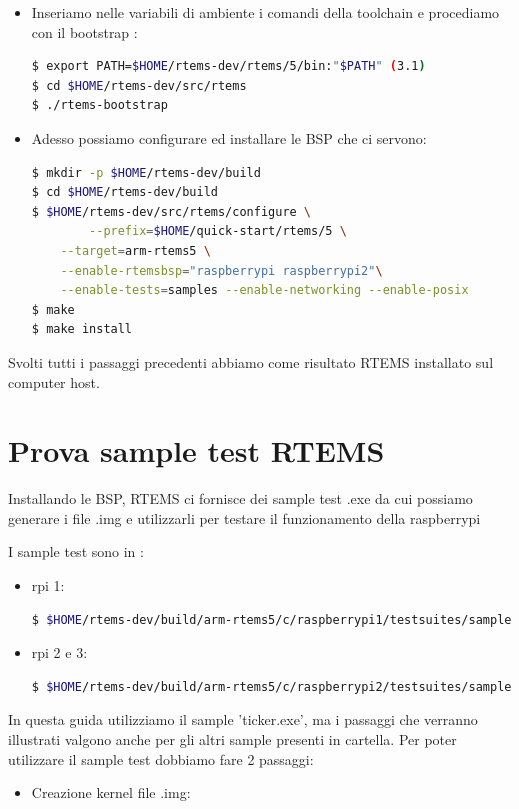 \documentclass[10pt, a4paper]{article}
\begin{document}
\begin{flushleft}
\begin{itemize}
\item Inseriamo nelle variabili di ambiente i comandi della toolchain e procediamo con il bootstrap : 
\begin{lstlisting}[language=bash] 
$ export PATH=$HOME/rtems-dev/rtems/5/bin:"$PATH" (3.1)
$ cd $HOME/rtems-dev/src/rtems
$ ./rtems-bootstrap
\end{lstlisting}	
	
\item Adesso possiamo configurare ed installare le BSP che ci servono: 
\begin{lstlisting}[language=bash] 
$ mkdir -p $HOME/rtems-dev/build
$ cd $HOME/rtems-dev/build
$ $HOME/rtems-dev/src/rtems/configure \
        --prefix=$HOME/quick-start/rtems/5 \
	--target=arm-rtems5 \
	--enable-rtemsbsp="raspberrypi raspberrypi2"\
	--enable-tests=samples --enable-networking --enable-posix
$ make
$ make install	
\end{lstlisting}
		
\end{itemize}

Svolti tutti i passaggi precedenti abbiamo come risultato RTEMS installato sul computer host.
\newpage
\section{Prova sample test RTEMS}

Installando le BSP, RTEMS ci fornisce dei sample test .exe da cui possiamo generare i file .img e utilizzarli per testare il funzionamento della raspberrypi

I sample test sono in : 
\begin{itemize}
\item  rpi 1:
\begin{lstlisting}[language=bash] 
$ $HOME/rtems-dev/build/arm-rtems5/c/raspberrypi1/testsuites/samples
\end{lstlisting}
\item  rpi 2 e 3:
\begin{lstlisting}[language=bash] 
$ $HOME/rtems-dev/build/arm-rtems5/c/raspberrypi2/testsuites/samples
\end{lstlisting}
\end{itemize}

In questa guida utilizziamo il sample 'ticker.exe', ma i passaggi che verranno illustrati valgono anche per gli altri sample presenti in cartella.
Per poter utilizzare il sample test dobbiamo fare 2 passaggi:
\begin{itemize}
\item Creazione kernel file .img:


\end{itemize}
\end{flushleft}
\end{document}
